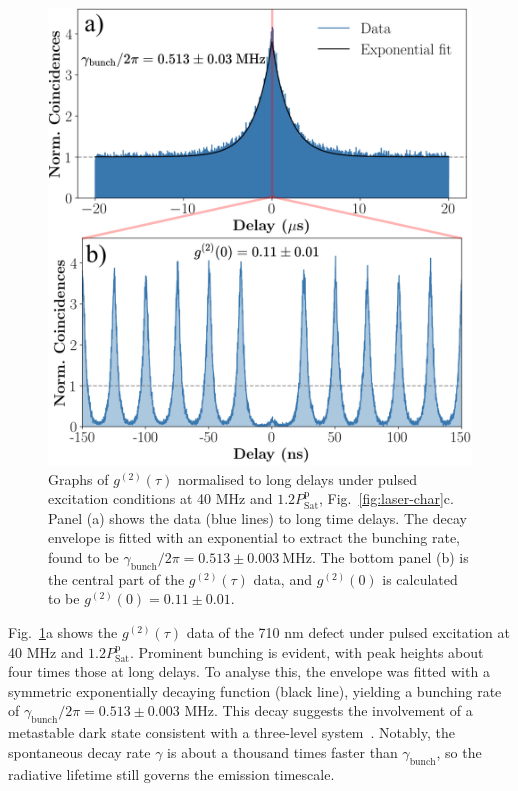 \begin{figure}[h!]
    \centering
    \includegraphics[width=0.8\linewidth]{Figures/pulsedg2.png}
    \caption{Graphs of $g^{(2)}(\tau)$ normalised to long delays under pulsed excitation conditions at 40 MHz and $1.2P^{\text{p}}_{\text{Sat}}$, Fig.~\ref{fig:laser-char}c. Panel (a) shows the data (blue lines) to long time delays. The decay envelope is fitted with an exponential to extract the bunching rate, found to be $\gamma_{\text{bunch}}/2\pi=0.513\pm0.003 \ \text{MHz}$. The bottom panel (b) is the central part of the $g^{(2)}(\tau)$ data, and $g^{(2)}(0)$ is calculated to be $g^{(2)}(0) = 0.11 \pm 0.01$.} 
    \label{fig:pulsedg2}
\end{figure}

Fig.~\ref{fig:pulsedg2}a shows the $g^{(2)}(\tau)$ data of the 710 nm defect under pulsed excitation at 40 MHz and $1.2P^{\text{p}}_{\text{Sat}}$. Prominent bunching is evident, with peak heights about four times those at long delays. To analyse this, the envelope was fitted with a symmetric exponentially decaying function (black line), yielding a bunching rate of $\gamma_{\text{bunch}}/2\pi=0.513\pm0.003$ MHz. This decay suggests the involvement of a metastable dark state consistent with a three-level system~\cite{Boll2020}. Notably, the spontaneous decay rate $\gamma$ is about a thousand times faster than $\gamma_{\text{bunch}}$, so the radiative lifetime still governs the emission timescale.


